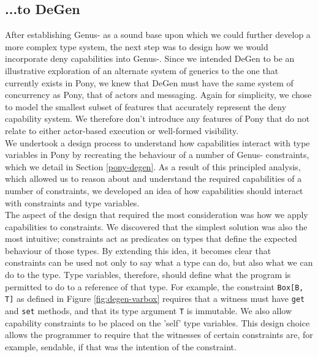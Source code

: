\subsection{...to DeGen}

After establishing Genus- as a sound base upon which we could further develop a more complex type system, the next step was to design how we would incorporate deny capabilities into Genus-. Since we intended DeGen to be an illustrative exploration of an alternate system of generics to the one that currently exists in Pony, we knew that DeGen must have the same system of concurrency as Pony, that of actors and messaging. Again for simplicity, we chose to model the smallest subset of features that accurately represent the deny capability system. We therefore don't introduce any features of Pony that do not relate to either actor-based execution or well-formed visibility. \\

We undertook a design process to understand how capabilities interact with type variables in Pony by recreating the behaviour of a number of Genus- constraints, which we detail in Section \ref{pony-degen}. As a result of this principled analysis, which allowed us to reason about and understand the required capabilities of a number of constraints, we developed an idea of how capabilities should interact with constraints and type variables. \\

The aspect of the design that required the most consideration was how we apply capabilities to constraints. We discovered that the simplest solution was also the most intuitive; constraints act as predicates on types that define the expected behaviour of those types. By extending this idea, it becomes clear that constraints can be used not only to say what a type can do, but also what we can do to the type. Type variables, therefore, should define what the program is permitted to do to a reference of that type. For example, the constraint \texttt{Box[B, T]} as defined in Figure \ref{fig:degen-varbox} requires that a witness must have \texttt{get} and \texttt{set} methods, and that its type argument \texttt{T} is immutable. We also allow capability constraints to be placed on the 'self' type variables. This design choice allows the programmer to require that the witnesses of certain constraints are, for example, sendable, if that was the intention of the constraint. \\


